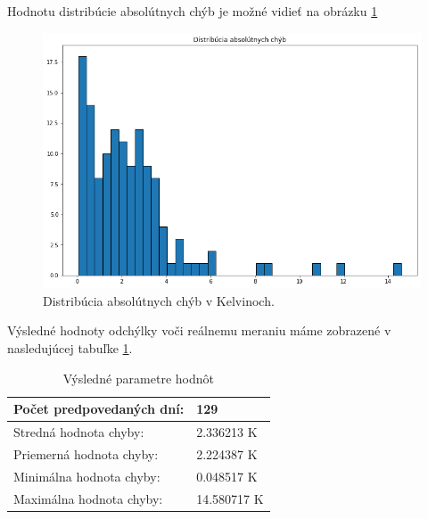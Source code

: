 \newline
Hodnotu distribúcie absolútnych chýb je možné vidieť na obrázku \ref{dest_abs_error}
\begin{figure}[!htbp]
  \centering
  \includegraphics[width=14cm]{img/dist_abs_chyby.png}
  \caption{Distribúcia absolútnych chýb v Kelvinoch.}
  \label{dest_abs_error}
\end{figure}


Výsledné hodnoty odchýlky voči reálnemu meraniu máme zobrazené v nasledujúcej tabuľke \ref{tab_chyby}.

\begin{table}[!htbp]
\caption{Výsledné parametre hodnôt}
\centering
\label{tab_chyby}
\begin{tabular}{|l|l|} \hline
Počet predpovedaných dní: & 129         \\ \hline
Stredná hodnota chyby:    & 2.336213 K  \\ \hline
Priemerná hodnota chyby:  & 2.224387 K  \\ \hline
Minimálna hodnota chyby:  & 0.048517 K  \\ \hline
Maximálna hodnota chyby:  & 14.580717 K \\ \hline
\end{tabular}
\end{table}